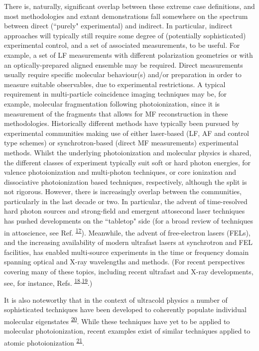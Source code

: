\documentclass[10pt]{article}
\begin{document}
There is, naturally, significant overlap between these extreme case definitions, and most methodologies and extant demonstrations fall somewhere on the spectrum between direct (``purely" experimental) and indirect. In particular, indirect approaches will typically still require some degree of (potentially sophisticated) experimental control, and a set of associated measurements, to be useful. For example, a set of LF measurements with different polarization geometries or with an optically-prepared aligned ensemble may be required. Direct measurements usually require specific molecular behaviour(s) and/or preparation in order to measure suitable observables, due to experimental restrictions. A typical requirement in multi-particle coincidence imaging techniques may be, for example, molecular fragmentation following photoionization, since it is measurement of the fragments that allows for MF reconstruction in these methodologies. Historically different methods have typically been pursued by experimental communities making use of either laser-based (LF, AF and control type schemes) or synchrotron-based (direct MF measurements) experimental methods. Whilst the underlying photoionization and molecular physics is shared, the different classes of experiment typically suit soft or hard photon energies, for valence photoionization and multi-photon techniques, or core ionization and dissociative photoionization based techniques, respectively, although the split is not rigorous. However, there is increasingly overlap between the communities, particularly in the last decade or two. In particular, the advent of time-resolved hard photon sources and strong-field and emergent attosecond laser techniques has pushed developments on the ``tabletop" side (for a broad review of techniques in attoscience, see Ref. \textsuperscript{\hyperref[csl:17]{17}}). Meanwhile, the advent of free-electron lasers (FELs), and the increasing availability of modern ultrafast lasers at synchrotron and FEL facilities, has enabled multi-source experiments in the time or frequency domain spanning optical and X-ray wavelengths and methods. (For recent perspectives covering many of these topics, including recent ultrafast and X-ray developments, see, for instance, Refs. \textsuperscript{\hyperref[csl:18]{18},\hyperref[csl:19]{19}}.)

It is also noteworthy that in the context of ultracold physics a number of sophisticated techniques have been developed to coherently populate individual molecular eigenstates \textsuperscript{\hyperref[csl:20]{20}}. While these techniques have yet to be applied to molecular photoionization, recent examples exist of similar techniques applied to atomic photoionization \textsuperscript{\hyperref[csl:21]{21}}.
\end{document}
